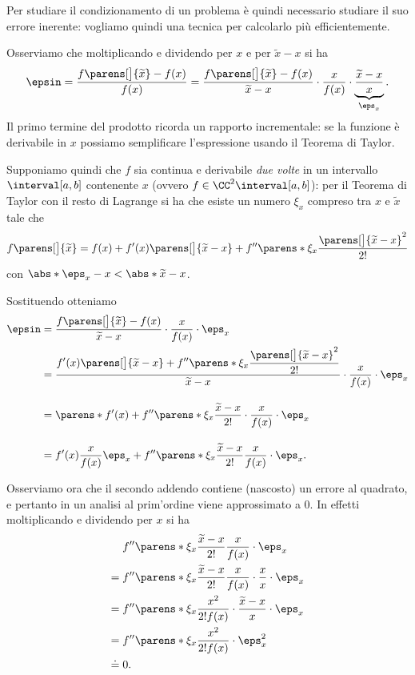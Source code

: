 Per studiare il condizionamento di un problema è quindi necessario studiare il suo errore inerente: vogliamo quindi una tecnica per calcolarlo più efficientemente.

Osserviamo che moltiplicando e dividendo per $x$ e per $\tilde x - x$ si ha \begin{align*}
    \epsin = \frac{f\parens[\big]{\tilde x} - f(x)}{f(x)}
    = \frac{f\parens[\big]{\tilde x} - f(x)}{\tilde x - x} \cdot \frac{x}{f(x)} \cdot \underbrace{\frac{\tilde x - x}{x}}_{\eps_x}.    
\end{align*} Il primo termine del prodotto ricorda un rapporto incrementale: se la funzione è derivabile in $x$ possiamo semplificare l'espressione usando il Teorema di Taylor.

Supponiamo quindi che $f$ sia continua e derivabile \emph{due volte} in un intervallo $\interval[{a, b}]$ contenente $x$ (ovvero $f \in \CC^2\interval[{a, b}]$): per il Teorema di Taylor con il resto di Lagrange si ha che esiste un numero $\xi_x$ compreso tra $x$ e $\tilde x$ tale che \[
    f\parens[\big]{\tilde x} = f(x) + f'(x)\parens[\big]{\tilde x - x} + f''\parens*{\xi_x}\frac{\parens[\big]{\tilde x - x}^2}{2!}
\] con $\abs*{\eps_x - x} < \abs*{\tilde x - x}$. 

Sostituendo otteniamo \begin{align*}
    \epsin &=  \frac{f\parens[\big]{\tilde x} - f(x)}{\tilde x - x} \cdot \frac{x}{f(x)} \cdot \eps_x\\
    &= \frac{\displaystyle f'(x)\parens[\big]{\tilde x - x} + f''\parens*{\xi_x}\frac{\parens[\big]{\tilde x - x}^2}{2!}}{\tilde x - x} \cdot \frac{x}{f(x)} \cdot \eps_x\\[1em]
    &= \parens*{f'(x) + f''\parens*{\xi_x}\frac{\tilde x - x}{2!}} \cdot \frac{x}{f(x)} \cdot \eps_x\\[1em]
    &= f'(x) \frac{x}{f(x)} \eps_x + f''\parens*{\xi_x}\frac{\tilde x - x}{2!}\frac{x}{f(x)} \cdot \eps_x. 
\end{align*}

Osserviamo ora che il secondo addendo contiene (nascosto) un errore al quadrato, e pertanto in un analisi al prim'ordine viene approssimato a $0$. In effetti moltiplicando e dividendo per $x$ si ha \begin{align*}
    &f''\parens*{\xi_x}\frac{\tilde x - x}{2!}\frac{x}{f(x)} \cdot \eps_x \\
    = {}&f''\parens*{\xi_x}\frac{\tilde x - x}{2!}\frac{x}{f(x)} \cdot \frac{x}{x} \cdot \eps_x \\
    = {}&f''\parens*{\xi_x}\frac{x^2}{2!f(x)} \cdot \frac{\tilde x - x}{x} \cdot \eps_x \\
    = {}&f''\parens*{\xi_x}\frac{x^2}{2!f(x)} \cdot \eps_x^2\\
    \doteq {}& 0.
\end{align*}  

